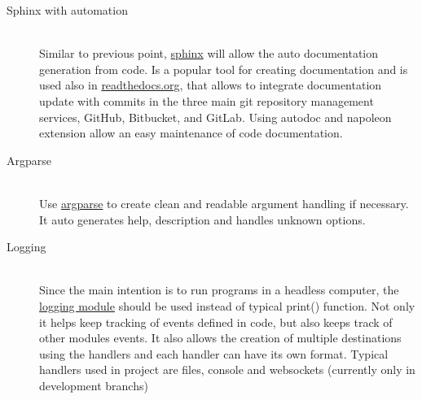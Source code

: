 \begin{description}
	\item[Sphinx with automation] \hfill \\ Similar to previous point, \href{http://www.sphinx-doc.org/en/master/}{sphinx} will allow the auto documentation generation from code. Is a popular tool for creating documentation and is used also in \href{https://readthedocs.org}{readthedocs.org}, that allows to integrate documentation update with commits in the three main git repository management services, GitHub, Bitbucket, and GitLab. Using autodoc and napoleon extension allow an easy maintenance of code documentation.
	\item[Argparse] \hfill \\ Use \href{https://docs.python.org/3/library/argparse.html}{argparse} to create clean and readable argument handling if necessary. It auto generates help, description and handles unknown options.
	\item[Logging] \hfill \\ Since the main intention is to run programs in a headless computer, the \href{https://docs.python.org/3/library/logging.html}{logging module} should be used instead of typical print() function. Not only it helps keep tracking of events defined in code, but also keeps track of other modules events. It also allows the creation of multiple destinations using the handlers and each handler can have its own format. Typical handlers used in project are files, console and websockets (currently only in development branchs)
\end{description}




 





